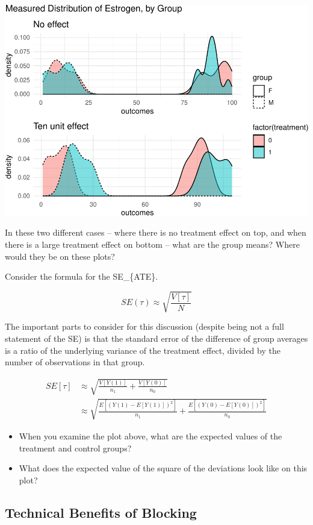 \documentclass[
]{article}
\providecommand{\tightlist}{%
  \setlength{\itemsep}{0pt}\setlength{\parskip}{0pt}}
\begin{document}
\includegraphics{241-live-session_files/figure-latex/unnamed-chunk-1-1.pdf}

In these two different cases -- where there is no treatment effect on top, and when there is a large treatment effect on bottom -- what are the group means? Where would they be on these plots?

Consider the formula for the SE\_\{ATE\}.

\[
  SE(\tau) \approx \sqrt{\frac{V[\tau]}{N}}
\]

The important parts to consider for this discussion (despite being not a full statement of the SE) is that the standard error of the difference of group averages is a ratio of the underlying variance of the treatment effect, divided by the number of observations in that group.

\[
  \begin{aligned}
  SE[\tau] & \approx \sqrt{\frac{V[Y(1)]}{n_{1}} + \frac{V[Y(0)]}{n_{0}}} \\ 
           & \approx \sqrt{\frac{E[\left(Y(1) - E[Y(1)]\right)^2]}{n_{1}} + \frac{E[\left(Y(0) - E[Y(0)]\right)^2]}{n_{0}}}
  \end{aligned}
\]

\begin{itemize}
\tightlist
\item
  When you examine the plot above, what are the expected values of the treatment and control groups?
\item
  What does the expected value of the square of the deviations look like on this plot?
\end{itemize}

\hypertarget{technical-benefits-of-blocking}{%
\subsection{Technical Benefits of Blocking}\label{technical-benefits-of-blocking}}
\end{document}
